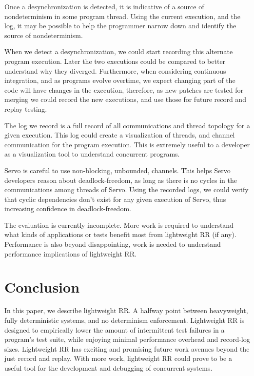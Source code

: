 \documentclass{article}
\begin{document}
Once a desynchronization is detected, it is indicative of a source of nondeterminism
in some program thread. Using the current execution, and the log, it may be possible
to help the programmer narrow down and identify the source of nondeterminism.

When we detect a desynchronization, we could start recording this alternate program
execution. Later the two executions could be compared to better understand why
they diverged. Furthermore, when considering continuous integration, and as programs
evolve overtime, we expect changing part of the code will have changes in the execution,
therefore, as new patches are tested for merging we could record the new executions,
and use those for future record and replay testing.

The log we record is a full record of all communications and thread topology for a
given execution. This log could create a visualization of threads, and channel
communication for the program execution. This is extremely useful to a developer as
a visualization tool to understand concurrent programs.

Servo is careful to use non-blocking, unbounded, channels. This helps Servo developers
reason about deadlock-freedom, as long as there is no cycles in the communications among
threads
of Servo. Using the recorded logs, we could verify that cyclic dependencies don't exist
for any given execution of Servo, thus increasing confidence in deadlock-freedom.

The evaluation is currently incomplete. More work is required to understand what kinds
of applications or tests benefit most from lightweight RR (if any). Performance is also
beyond disappointing, work is needed to understand performance implications of lightweight
RR.

\section{Conclusion}
In this paper, we describe lightweight RR. A halfway point between heavyweight, fully
deterministic systems, and no determinism enforcement. Lightweight RR is designed to
empirically lower the amount of intermittent test failures in a program's test suite,
while enjoying minimal performance overhead and record-log sizes. Lightweight
RR has exciting and promising future work avenues beyond the just record and replay.
With more work, lightweight RR could prove to be a useful tool for the development
and debugging of concurrent systems.
\end{document}
